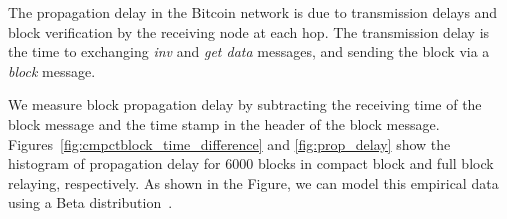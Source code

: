 


 The propagation delay in the Bitcoin network is due to transmission delays and block verification by the receiving node at each hop. The transmission delay is the time to exchanging \textit{inv} and \textit{get data} messages, and sending the block via a \textit{block} message. 

 We measure block propagation delay by subtracting the receiving time of the block message and the time stamp in the header of the block message. Figures~\ref{fig:cmpctblock_time_difference} and \ref{fig:prop_delay} show the histogram of propagation delay for  $6000$ blocks in compact block and full block relaying, respectively. 
As shown in the Figure, we can model this empirical data using a Beta distribution~\cite{probabilitybook}. %

